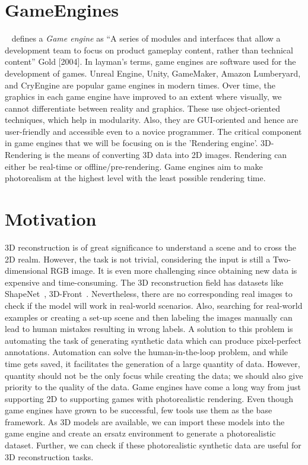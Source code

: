\section{GameEngines}\label{sec:gameengines}
~\cite{Ee2005} defines a \emph{Game engine} as  “A series of modules and interfaces that allow a development team to focus on product gameplay content,
rather than technical content” Gold [2004].
In layman’s terms, game engines are software used for the development of games.
Unreal Engine, Unity, GameMaker, Amazon Lumberyard, and CryEngine are popular game engines in modern times.
Over time, the graphics in each game engine have improved to an extent where visually, we cannot differentiate between reality and graphics.
These use object-oriented techniques, which help in modularity.
Also, they are GUI-oriented and hence are user-friendly and accessible even to a novice programmer.
The critical component in game engines that we will be focusing on is the ’Rendering engine’.
3D-Rendering is the means of converting 3D data into 2D images.
Rendering can either be real-time or offline/pre-rendering.
Game engines aim to make photorealism at the highest level with the least possible rendering time.


\section{Motivation}\label{sec:Background and motivation}

3D reconstruction is of great significance to understand a scene and to cross the 2D realm.
However, the task is not trivial, considering the input is still a Two-dimensional RGB image.
It is even more challenging since obtaining new data is expensive and time-consuming.
The 3D reconstruction field has datasets like ShapeNet~\cite{shapenet2015}, 3D-Front~\cite{Fu20203DFRONT3F}.
Nevertheless, there are no corresponding real images to check if the model will work in real-world scenarios.
Also, searching for real-world examples or creating a set-up scene and then labeling the images manually can lead to human mistakes resulting in wrong labels.
A solution to this problem is automating the task of generating synthetic data which can produce pixel-perfect annotations.
Automation can solve the human-in-the-loop problem, and while time gets saved, it facilitates the generation of a large quantity of data.
However, quantity should not be the only focus while creating the data;
we should also give priority to the quality of the data.
Game engines have come a long way from just supporting 2D to supporting games with photorealistic rendering.
Even though game engines have grown to be successful, few tools use them as the base framework.
As 3D models are available, we can import these models into the game engine and create an ersatz environment to generate a photorealistic dataset.
Further, we can check if these photorealistic synthetic data are useful for 3D reconstruction tasks.

